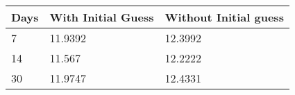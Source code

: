 \begin{tabular}{lll}
Days & With Initial Guess & Without Initial guess \\ 
\hline 
7 & 11.9392 & 12.3992 \\ 
14 & 11.567 & 12.2222 \\ 
30 & 11.9747 & 12.4331 \\ 
\hline 
\end{tabular}